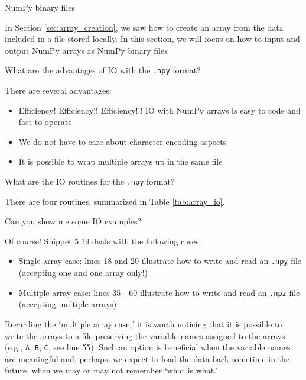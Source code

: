 \documentclass[a4paper,11pt]{book}
\newcommand{\question}[1]{%
    \begin{tcolorbox}[colback=comp_c!10,colframe=comp_c,sidebyside align=top,width=\linewidth,before skip=1ex]
        #1
    \end{tcolorbox}
    \switchcolumn%
}
\newcommand{\note}[1]{%
    \begin{tcolorbox}[colback=white!0,colframe=white!10,width=\linewidth,before skip=1ex]
        #1
    \end{tcolorbox}
}
\begin{document}
\begin{paracol}{2}
	\question{\raggedright NumPy binary files}
	\note{In Section \ref{sec:array_creation}, we saw how to create an array from the data included in a file stored locally. In this section, we will focus on how to input and output NumPy arrays as NumPy binary files}
\end{paracol}

\begin{paracol}{2}
	\question{\raggedright What are the advantages of IO with the \texttt{.npy} format?}
	\note{There are several advantages:
	\begin{itemize}
		\item Efficiency! Efficiency!! Efficiency!!! IO with NumPy arrays is easy to code and fast to operate
		\item We do not have to care about character encoding aspects
		\item It is possible to wrap multiple arrays up in the same file
	\end{itemize}
	}
\end{paracol}

\begin{paracol}{2}
	\question{\raggedright What are the IO routines for the \texttt{.npy} format?}
	\note{There are four routines, summarized in Table \ref{tab:array_io}.}
\end{paracol}

\begin{paracol}{2}
	\question{\raggedright Can you show me some IO examples?}
	\note{Of course! Snippet 5.19 deals with the following cases:
	
	\begin{itemize}
		\item Single array case: lines 18 and 20 illustrate how to write and read an \texttt{.npy} file (accepting one and one array only!)
		\item Multiple array case: lines 35 - 60 illustrate how to write and read an \texttt{.npz} file (accepting multiple arrays)
	\end{itemize}

	\quad Regarding the `multiple array case,' it is worth noticing that it is possible to write the arrays to a file preserving the variable names assigned to the arrays (e.g., \texttt{A}, \texttt{B}, \texttt{C}, see line 55). Such an option is beneficial when the variable names are meaningful and, perhaps, we expect to load the data back sometime in the future, when we may or may not remember `what is what.'
	}
\end{paracol}
\end{document}
